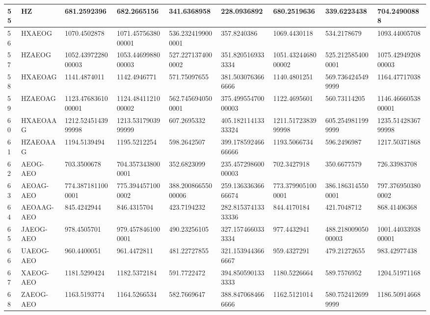 {\begin{longtable}{|l|l|l|l|l|l|l|l|l|}
        55 & HZ & 681.2592396 & 682.2665156 & 341.6368958 & 228.0936892 & 680.2519636 & 339.6223438 & 704.24900888 \\ \hline
        56 & HXAEOG & 1070.4502878 & 1071.4575638000001 & 536.2324199000001 & 357.8240386 & 1069.4430118 & 534.2178679 & 1093.44005708 \\ \hline
        57 & HZAEOG & 1052.4397228000003 & 1053.4469988000003 & 527.2271374000002 & 351.8205169333334 & 1051.4324468000002 & 525.2125854000001 & 1075.4294920800003 \\ \hline
        58 & HXAEOAG & 1141.4874011 & 1142.4946771 & 571.75097655 & 381.5030763666666 & 1140.4801251 & 569.7364245499999 & 1164.47717038 \\ \hline
        59 & HZAEOAG & 1123.4768361000001 & 1124.4841121000002 & 562.7456940500001 & 375.49955470000003 & 1122.4695601 & 560.73114205 & 1146.4666053800001 \\ \hline
        60 & HXAEOAAG & 1212.5245143999998 & 1213.5317903999999 & 607.2695332 & 405.18211413333324 & 1211.5172383999998 & 605.2549811999999 & 1235.5142836799998 \\ \hline
        61 & HZAEOAAG & 1194.5139494 & 1195.5212254 & 598.2642507 & 399.17859246666666 & 1193.5066734 & 596.2496987 & 1217.50371868 \\ \hline
        62 & AEOG-AEO & 703.3500678 & 704.3573438000001 & 352.6823099 & 235.45729860000003 & 702.3427918 & 350.6677579 & 726.33983708 \\ \hline
        63 & AEOAG-AEO & 774.3871811000001 & 775.3944571000002 & 388.20086655000006 & 259.13633636666674 & 773.3799051000001 & 386.1863145500001 & 797.3769503800002 \\ \hline
        64 & AEOAAG-AEO & 845.4242944 & 846.4315704 & 423.7194232 & 282.81537413333336 & 844.4170184 & 421.7048712 & 868.41406368 \\ \hline
        65 & JAEOG-AEO & 978.4505701 & 979.4578461000001 & 490.23256105 & 327.1574660333334 & 977.4432941 & 488.21800905000003 & 1001.4403393800001 \\ \hline
        66 & UAEOG-AEO & 960.4400051 & 961.4472811 & 481.22727855 & 321.1539443666667 & 959.4327291 & 479.21272655 & 983.42977438 \\ \hline
        67 & XAEOG-AEO & 1181.5299424 & 1182.5372184 & 591.7722472 & 394.8505901333333 & 1180.5226664 & 589.7576952 & 1204.51971168 \\ \hline
        68 & ZAEOG-AEO & 1163.5193774 & 1164.5266534 & 582.7669647 & 388.8470684666666 & 1162.5121014 & 580.7524126999999 & 1186.50914668 \\ \hline

\end{longtable}}
